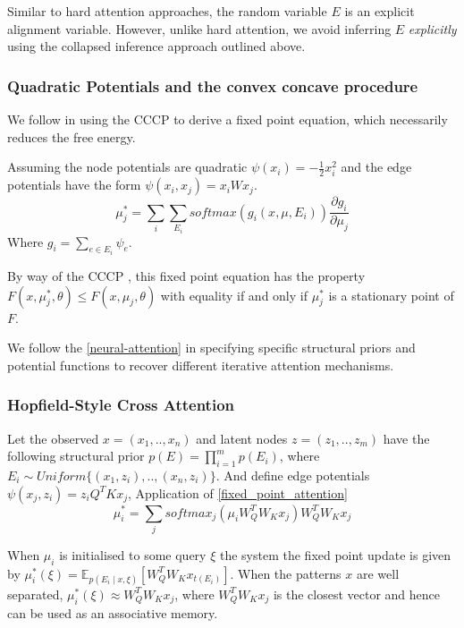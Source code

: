 \documentclass{article}
\theoremstyle{plain}
\theoremstyle{definition}
\theoremstyle{remark}
\begin{document}
Similar to hard attention approaches, the random variable $E$  is an explicit alignment variable. However, unlike hard attention, we avoid inferring $E$ \textit{explicitly} using the collapsed inference approach outlined above. 


\subsubsection{Quadratic Potentials and the convex concave procedure}
We follow \cite{ramsauer_hopfield_2021} in using the CCCP to derive a fixed point equation, which necessarily reduces the free energy. 

Assuming the node potentials are quadratic $\psi(x_i) = -\frac{1}{2}x_i^2$ and the edge potentials have the form $\psi(x_i, x_j) = x_iWx_j$.
\begin{equation}
    \mu_j^{*} =  \sum_i \sum_{E_i} softmax(g_i(x, \mu, E_i))\frac{\partial g_i}{\partial \mu_j} \label{fixed_point_attention}
\end{equation}
Where $g_i = \sum_{e \in E_i}\psi_e$.

By way of the CCCP \cite{yuille_concave-convex_2001}, this fixed point equation has the property $F(x, \mu_j^*, \theta) \leq F(x, \mu_j, \theta)$ with equality if and only if $\mu_j^*$ is a stationary point of $F$.

We follow the \ref{neural-attention} in specifying specific structural priors and potential functions to recover different iterative attention mechanisms.

\subsubsection{Hopfield-Style Cross Attention}
Let the observed $x =(x_1,..,x_n)$ and latent nodes $z=(z_1,..,z_m)$ have the following structural prior $p(E) = \prod_{i=1}^m p(E_i)$, where $E_i \sim Uniform\{(x_1, z_i),..,(x_n, z_i)\}$. And define edge potentials $\psi(x_j, z_i)=z_iQ^TKx_j$, Application of \eqref{fixed_point_attention}
$$\mu_i^{*} =  \sum_{j} softmax_j(\mu_iW_{Q}^TW_Kx_j)W_Q^T W_K x_j$$

When $\mu_i$ is initialised to some query $\xi$ the system
\cite{ramsauer_hopfield_2021} the fixed point update is given by $\mu_i^{*}(\xi) = \mathbb{E}_{p(E_i \mid x, \xi)}[W_Q^T W_Kx_{t(E_i)}]$. When the patterns $x$ are well separated, $\mu_i^*(\xi) \approx W_Q^T W_Kx_j$, where $W_Q^T W_Kx_j$ is the closest vector and hence can be used as an associative memory.
\end{document}

